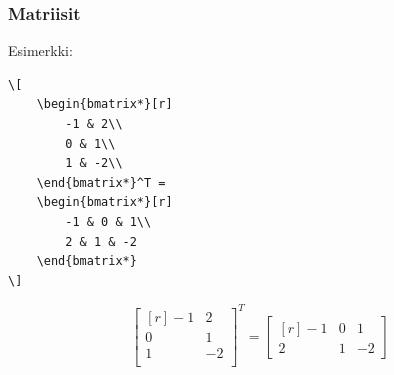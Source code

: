 \begin{frame}[fragile]
    \frametitle{Matriisit}

    Esimerkki:\vaihto
    \begin{minipage}{5cm}
        \begin{scriptsize}
            \begin{Verbatim}[frame=single]
\[
    \begin{bmatrix*}[r]
        -1 & 2\\
        0 & 1\\
        1 & -2\\
    \end{bmatrix*}^T = 
    \begin{bmatrix*}[r]
        -1 & 0 & 1\\
        2 & 1 & -2
    \end{bmatrix*}
\]
            \end{Verbatim}
        \end{scriptsize}
    \end{minipage}
    \begin{minipage}{5cm}
        \[
        \begin{bmatrix*}[r]
            -1 & 2\\
            0 & 1\\
            1 & -2\\
        \end{bmatrix*}^T = 
        \begin{bmatrix*}[r]
            -1 & 0 & 1\\
            2 & 1 & -2
        \end{bmatrix*}
        \]
    \end{minipage}
\end{frame}
